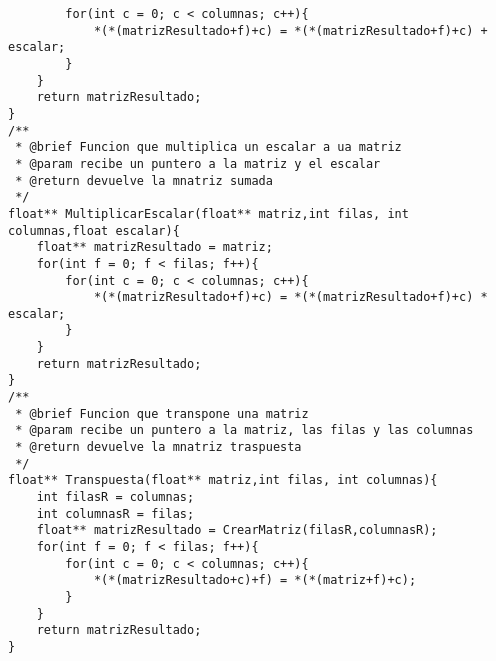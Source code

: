 \begin{verbatim}
        for(int c = 0; c < columnas; c++){
            *(*(matrizResultado+f)+c) = *(*(matrizResultado+f)+c) + escalar;
        }
    }
    return matrizResultado;
}
/**
 * @brief Funcion que multiplica un escalar a ua matriz
 * @param recibe un puntero a la matriz y el escalar
 * @return devuelve la mnatriz sumada
 */
float** MultiplicarEscalar(float** matriz,int filas, int columnas,float escalar){
    float** matrizResultado = matriz;
    for(int f = 0; f < filas; f++){
        for(int c = 0; c < columnas; c++){
            *(*(matrizResultado+f)+c) = *(*(matrizResultado+f)+c) * escalar;
        }
    }
    return matrizResultado;
}
/**
 * @brief Funcion que transpone una matriz
 * @param recibe un puntero a la matriz, las filas y las columnas
 * @return devuelve la mnatriz traspuesta
 */
float** Transpuesta(float** matriz,int filas, int columnas){
    int filasR = columnas;
    int columnasR = filas;
    float** matrizResultado = CrearMatriz(filasR,columnasR);
    for(int f = 0; f < filas; f++){
        for(int c = 0; c < columnas; c++){
            *(*(matrizResultado+c)+f) = *(*(matriz+f)+c);
        }
    }
    return matrizResultado;
}
\end{verbatim}


